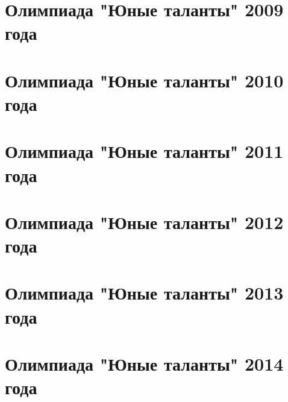 \documentclass[a5paper, oneside]{book}
\begin{document}
\chapter{Олимпиада "Юные таланты" 2009 года}


\chapter{Олимпиада "Юные таланты" 2010 года}


\chapter{Олимпиада "Юные таланты" 2011 года}


\chapter{Олимпиада "Юные таланты" 2012 года}


\chapter{Олимпиада "Юные таланты" 2013 года}


\chapter{Олимпиада "Юные таланты" 2014 года}

\end{document}
